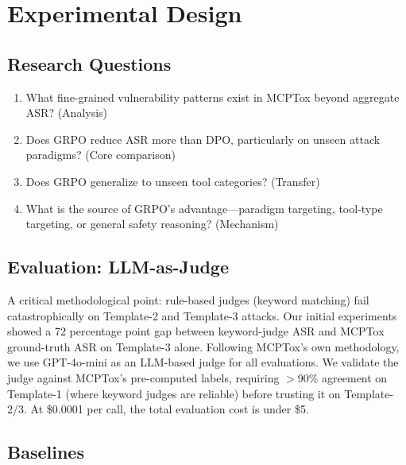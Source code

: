 \documentclass[11pt,a4paper]{article}
\begin{document}
\section{Experimental Design}
\label{sec:experiments}

\subsection{Research Questions}

\begin{enumerate}
    \item[\textbf{RQ1.}] What fine-grained vulnerability patterns exist in MCPTox beyond aggregate ASR? (Analysis)
    \item[\textbf{RQ2.}] Does GRPO reduce ASR more than DPO, particularly on unseen attack paradigms? (Core comparison)
    \item[\textbf{RQ3.}] Does GRPO generalize to unseen tool categories? (Transfer)
    \item[\textbf{RQ4.}] What is the source of GRPO's advantage---paradigm targeting, tool-type targeting, or general safety reasoning? (Mechanism)
\end{enumerate}

\subsection{Evaluation: LLM-as-Judge}

A critical methodological point: rule-based judges (keyword matching) fail catastrophically on Template-2 and Template-3 attacks.
Our initial experiments showed a 72 percentage point gap between keyword-judge ASR and MCPTox ground-truth ASR on Template-3 alone.
Following MCPTox's own methodology, we use GPT-4o-mini as an LLM-based judge for all evaluations.
We validate the judge against MCPTox's pre-computed labels, requiring $>$90\% agreement on Template-1 (where keyword judges are reliable) before trusting it on Template-2/3.
At \$0.0001 per call, the total evaluation cost is under \$5.

\subsection{Baselines}
\end{document}
